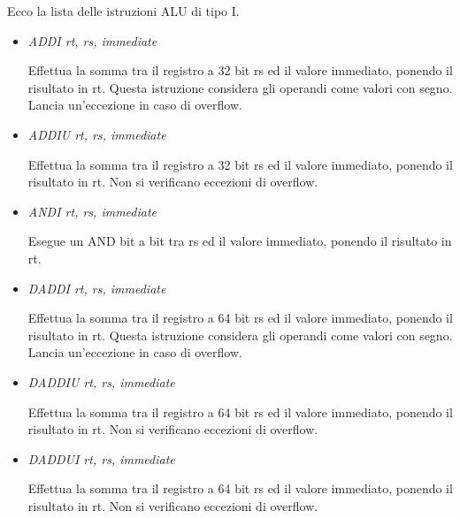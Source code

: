 \documentclass[letterpaper,10pt,italian]{sphinxmanual}
\begin{document}
Ecco la lista delle istruzioni ALU di tipo I.
\begin{itemize}
\item {} 
\emph{ADDI rt, rs, immediate}

Effettua la somma tra il registro a 32 bit rs ed il valore immediato,
ponendo il risultato in rt.  Questa istruzione considera gli operandi come
valori con segno.  Lancia un'eccezione in caso di overflow.

\item {} 
\emph{ADDIU rt, rs, immediate}

Effettua la somma tra il registro a 32 bit rs ed il valore immediato,
ponendo il risultato in rt.  Non si verificano eccezioni di overflow.

\end{itemize}
\begin{itemize}
\item {} 
\emph{ANDI rt, rs, immediate}

Esegue un AND bit a bit tra rs ed il valore immediato, ponendo il risultato
in rt.

\item {} 
\emph{DADDI rt, rs, immediate}

Effettua la somma tra il registro a 64 bit rs ed il valore immediato,
ponendo il risultato in rt.  Questa istruzione considera gli operandi come
valori con segno.  Lancia un'eccezione in caso di overflow.

\item {} 
\emph{DADDIU rt, rs, immediate}

Effettua la somma tra il registro a 64 bit rs ed il valore immediato,
ponendo il risultato in rt.  Non si verificano eccezioni di overflow.

\end{itemize}
\begin{itemize}
\item {} 
\emph{DADDUI rt, rs, immediate}

Effettua la somma tra il registro a 64 bit rs ed il valore immediato,
ponendo il risultato in rt.  Non si verificano eccezioni di overflow.

\end{itemize}
\end{document}
